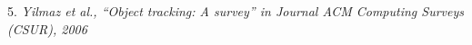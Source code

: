 \begin{frame}
\begin{columns}[t]
		\vspace{0.3cm}
		
	\end{columns}
	
	\vspace{-0.4cm}
	
	\begin{columns}
		
		\vspace{0.6cm}
		
		\tiny 5. \emph{Yilmaz et al., ``Object tracking: A survey'' in Journal ACM Computing Surveys (CSUR), 2006}
	\end{columns}
\end{frame}

